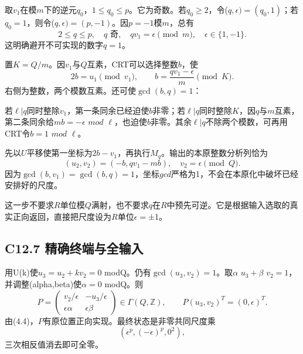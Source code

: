 {取\ensuremath{v_{1}}在模\ensuremath{m}下的逆元\ensuremath{q_{0}}，\ensuremath{1\le q_{0}\le p}。它为奇数。若\ensuremath{q_{0}\ge 2}，令(\ensuremath{q,\epsilon )=(q_{0},1)}；若\ensuremath{q_{0}=1}，则令(\ensuremath{q,\epsilon )=(p,-1)}。因\ensuremath{p=-1}模\ensuremath{m}，总有} \[
2\le q\le p,\quad q\text{ 奇},\quad
qv_1=\epsilon\pmod m,\quad\epsilon\in\{1,-1\}.
\tag{C12.6.1}
\] {这明确避开不可实现的数字\ensuremath{q=1}。}

{置\ensuremath{K=Q/m}。因\ensuremath{v_{1}}与\ensuremath{Q}互素，CRT可以选择整数\ensuremath{b}，使} \[
2b=u_1\pmod{v_1},\qquad
b=\frac{qv_1-\epsilon}{m}\pmod K.
\tag{C12.6.2}
\] {右侧为整数，两个模数互素。还可使\ensuremath{\operatorname{gcd}(b,q)=1}：}

{若\ensuremath{\ell |q}同时整除\ensuremath{v_{1}}，第一条同余已经迫使\ensuremath{b}非零；若\ensuremath{\ell |q}同时整除\ensuremath{K}，因\ensuremath{q}与\ensuremath{m}互素，第二条同余给\ensuremath{mb=-\epsilon }} {\ensuremath{mod}} {\ensuremath{\ell }，也迫使\ensuremath{b}非零。其余\ensuremath{\ell |q}不除两个模数，可再用CRT令\ensuremath{b=1}} {\ensuremath{mod}} {\ensuremath{\ell }。}

{先以\ensuremath{U}平移使第一坐标为\ensuremath{2b-v_{1}}，再执行\ensuremath{M_{q}}。输出的本原整数分析列恰为} \[
(u_2,v_2)=(-b,qv_1-mb),
\quad
\boxed{v_2=\epsilon\pmod Q.}
\tag{C12.6.3}
\] {因为\ensuremath{\operatorname{gcd}(b,v_{1})=\operatorname{gcd}(b,q)=1}，坐标\ensuremath{gcd}严格为1，不会在本原化中破坏已经安排好的尺度。}

{这一步不要求\ensuremath{R}单位模\ensuremath{Q}满射，也不要求\ensuremath{q}在\ensuremath{R}中预先可逆。它是根据输入选取的真实正向返回，直接把尺度设为\ensuremath{R}单位\ensuremath{\epsilon =}±1。}

\subsection*{\texorpdfstring{{C12.7} {精确终端与全输入}}{C12.7 精确终端与全输入}}\label{C12-h89}

{用U(k)使\ensuremath{u_{3}=u_{2}+kv_{2}=0}} {modQ。仍有\ensuremath{\operatorname{gcd}(u_{3},v_{2})=1}。取\ensuremath{\alpha }} {\ensuremath{u_{3}+\beta }} {\ensuremath{v_{2}=1}，并调整(alpha,beta)使\ensuremath{\alpha =0}} {modQ。则} \[
P=\begin{pmatrix}
v_2/\epsilon&-u_3/\epsilon\\
\epsilon\alpha&\epsilon\beta
\end{pmatrix}\in\Gamma(Q,\mathbb Z),
\qquad P(u_3,v_2)^T=(0,\epsilon)^T.
\] {由(4.4)，\ensuremath{P}有原位置正向实现。最终状态是非零共同尺度乘} \[
(\epsilon^p,(-\epsilon)^p,0^2),
\] {三次相反值消去即可全零。}

